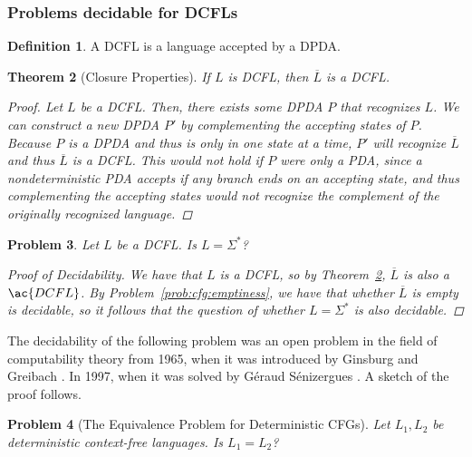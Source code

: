 \documentclass[psamsfonts]{amsart}
\newtheorem{thm}{Theorem}[section]
\newtheorem{prob}[thm]{Problem}
\theoremstyle{definition}
\newtheorem{defn}[thm]{Definition}
\theoremstyle{remark}
\numberwithin{equation}{section}
\begin{document}
\subsubsection{Problems decidable for DCFLs}
\cite{ginsburg65:_deter}
\begin{defn}
  A \ac{DCFL} is a language accepted by a
  \acl{DPDA}.
\end{defn}

\begin{thm}[Closure Properties]
  \label{dcfl:complement}
  If $L$ is \ac{DCFL}, then $\overline{L}$ is a
  \ac{DCFL}.
  \begin{proof}
    Let $L$ be a \ac{DCFL}. Then, there exists some \ac{DPDA} $P$ that
    recognizes $L$. We can construct a new \ac{DPDA} $P'$ by complementing the
    accepting states of $P$. Because $P$ is a \ac{DPDA} and thus is only in one
    state at a time, $P'$ will recognize $\overline{L}$ and thus $\overline{L}$
    is a \ac{DCFL}. This would not hold if $P$ were only a \ac{PDA}, since a
    nondeterministic \ac{PDA} accepts if \emph{any} branch ends on an accepting
    state, and thus complementing the accepting states would not recognize the
    complement of the originally recognized language.
\end{proof}
\end{thm}

\begin{prob}
  Let $L$ be a \ac{DCFL}. Is $L = \Sigma^*$?
  \begin{proof}[Proof of Decidability]
    We have that $L$ is a \ac{DCFL}, so by Theorem~\ref{dcfl:complement},
    $\overline{L}$ is also a $\ac{DCFL}$. By Problem~\ref{prob:cfg:emptiness},
    we have that whether $\overline{L}$ is empty is decidable, so it follows
    that the question of whether $L = \Sigma^*$ is also decidable.
  \end{proof}
\end{prob}

The decidability of the following problem was an open problem in the field of
computability theory from 1965, when it was introduced by Ginsburg and Greibach \cite{ginsburg65:_deter}. In 1997, when it was solved by G\'eraud S\'enizergues
\cite{senizergues_det_pd_decid}. A sketch of the proof follows. 

\begin{prob}[The Equivalence Problem for Deterministic CFGs]
  Let $L_1,L_2$ be deterministic context-free languages. Is $L_1=L_2$?
\todo{}
\end{prob}
\end{document}
